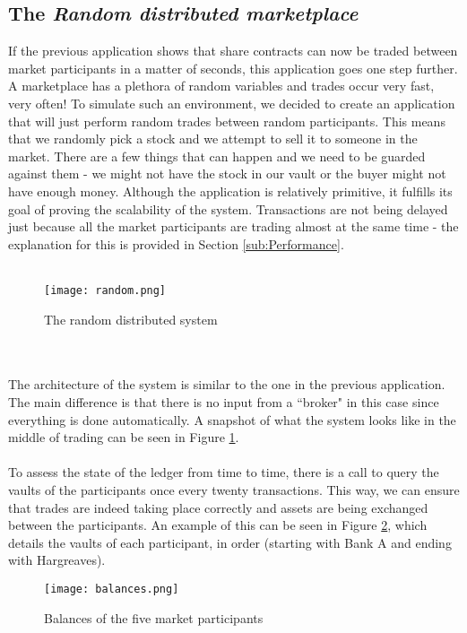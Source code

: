 \documentclass[12pt,twoside]{article}
\begin{document}
\subsection{The \textit{Random distributed marketplace}}
\label{sub:mkt}
If the previous application shows that share contracts can now be traded between market participants in a matter of seconds, this application goes one step further. A marketplace has a plethora of random variables and trades occur very fast, very often! To simulate such an environment, we decided to create an application that will just perform random trades between random participants. This means that we randomly pick a stock and we attempt to sell it to someone in the market. There are a few things that can happen and we need to be guarded against them - we might not have the stock in our vault or the buyer might not have enough money. Although the application is relatively primitive, it fulfills its goal of proving the scalability of the system. Transactions are not being delayed just because all the market participants are trading almost at the same time - the explanation for this is provided in Section \ref{sub:Performance}.
\\ \\
\begin{figure}[!htb]
\centering
\texttt{[image: random.png]}
\caption{The random distributed system}
\centering
\label{fig:random}
\end{figure}
\\ \\
The architecture of the system is similar to the one in the previous application. The main difference is that there is no input from a ``broker" in this case since everything is done automatically. A snapshot of what the system looks like in the middle of trading can be seen in Figure \ref{fig:random}.
\\ \\
To assess the state of the ledger from time to time, there is a call to query the vaults of the participants once every twenty transactions. This way, we can ensure that trades are indeed taking place correctly and assets are being exchanged between the participants. An example of this can be seen in Figure \ref{fig:balances}, which details the vaults of each participant, in order (starting with Bank A and ending with Hargreaves).
\\ 
\begin{figure}[!htb]
\centering
\texttt{[image: balances.png]}
\caption{Balances of the five market participants}
\centering
\label{fig:balances}
\end{figure}
\end{document}

